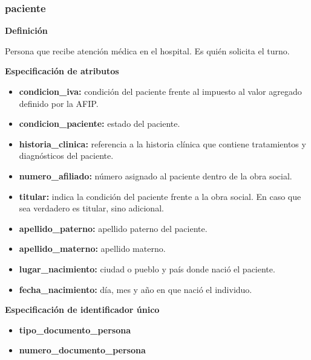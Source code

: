 \documentclass[a4paper,11pt]{article}
\begin{document}
\subsubsection{\textbf{paciente}}

\textbf{Definición}

Persona que recibe atención médica en el hospital. Es quién solicita el turno. 

\textbf{Especificación de atributos}

\begin{itemize}

  
   \item \textbf{condicion\_iva:} condición del paciente frente al impuesto al valor agregado 
   definido por la AFIP.

   \item \textbf{condicion\_paciente:} estado del paciente.

   \item \textbf{historia\_clinica:} referencia a la historia clínica que 
   contiene tratamientos y diagnósticos del paciente.

   \item \textbf{numero\_afiliado:} número asignado al paciente dentro de la obra social.

   \item \textbf{titular:} indica la condición del paciente frente a la obra social. En caso que sea verdadero es titular, sino adicional.
   
   \item \textbf{apellido\_paterno:} apellido paterno del paciente.

   \item \textbf{apellido\_materno:} apellido materno.
   
   \item \textbf{lugar\_nacimiento:} ciudad o pueblo y país donde nació el paciente.
	  
   \item \textbf{fecha\_nacimiento:} día, mes y año en que nació el individuo.
	
\end{itemize}

\textbf{Especificación de identificador único}

\begin{itemize}

    \item \textbf{tipo\_documento\_persona}

    \item \textbf{numero\_documento\_persona}

\end{itemize}
\end{document}

